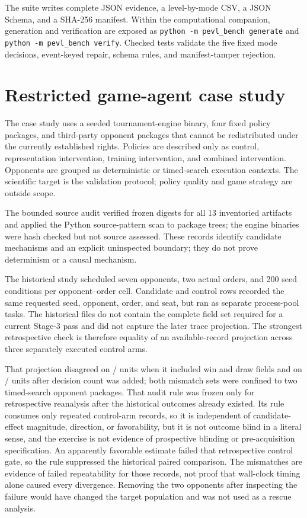 \documentclass[aps,reprint,superscriptaddress,longbibliography,floatfix]{revtex4-2}
\begin{document}
The suite writes complete JSON evidence, a level-by-mode CSV, a JSON Schema,
and a SHA-256 manifest.  Within the computational companion, generation and
verification are exposed as
\texttt{python -m pevl\_bench generate} and
\texttt{python -m pevl\_bench verify}.  Checked tests validate the five fixed
mode decisions, event-keyed repair, schema rules, and manifest-tamper rejection.

\section{Restricted game-agent case study}

The case study uses a seeded tournament-engine binary, four fixed policy
packages, and third-party opponent packages that cannot be redistributed under
the currently established rights.  Policies are described only as control,
representation intervention, training intervention, and combined intervention.
Opponents are grouped as deterministic or timed-search execution contexts.
The scientific target is the validation protocol; policy quality and game
strategy are outside scope.

The bounded source audit verified frozen digests for all 13 inventoried
artifacts and applied the Python source-pattern scan to
\SourceAssessedPackageTrees{} package trees; the \SourceUnassessedBinaries{}
engine binaries were hash checked but not source assessed.  These records
identify candidate mechanisms and an explicit uninspected boundary; they do
not prove determinism or a causal mechanism.

The historical study scheduled seven opponents, two actual orders, and 200
seed conditions per opponent--order cell.  Candidate and control rows recorded
the same requested seed, opponent, order, and seat, but ran as separate
process-pool tasks.  The historical files do not contain the complete field set
required for a current Stage-3 pass and did not capture the later trace
projection.  The strongest retrospective check is therefore equality of an
available-record projection across three separately executed control arms.

That projection disagreed on
\HistoricalOutcomeMismatch{}/\HistoricalUnits{} units when it included win and
draw fields and on \HistoricalAvailableRecordMismatch{}/\HistoricalUnits{}
units after decision count was added; both mismatch sets were confined to two
timed-search opponent packages.  That audit rule was frozen only for
retrospective reanalysis after the historical outcomes already existed.  Its
rule consumes only repeated control-arm records, so it is independent of
candidate-effect magnitude, direction, or favorability, but it is not outcome
blind in a literal sense, and the exercise is not evidence of prospective
blinding or pre-acquisition specification.  An apparently favorable estimate
failed that retrospective control gate, so the rule suppressed the historical
paired comparison.  The mismatches are evidence of failed repeatability for
those records, not proof that wall-clock timing alone caused every divergence.
Removing the two opponents after inspecting the failure would have changed the
target population and was not used as a rescue analysis.
\end{document}
